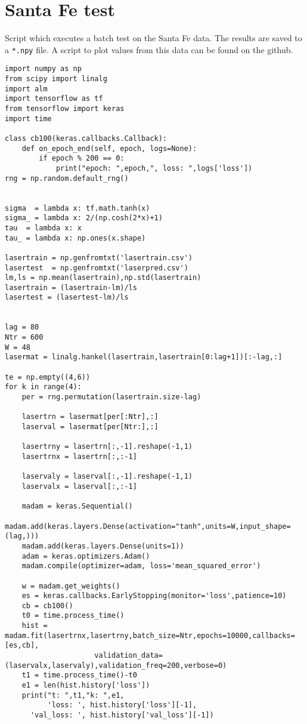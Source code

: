 \section{Santa Fe test}
Script which executes a batch test on the Santa Fe data. The results are saved to a \texttt{*.npy} file. A script to plot values from this data can be found on the github.
\label{santafecode}
\begin{verbatim}
import numpy as np
from scipy import linalg
import alm
import tensorflow as tf
from tensorflow import keras
import time

class cb100(keras.callbacks.Callback):
    def on_epoch_end(self, epoch, logs=None):
        if epoch % 200 == 0:
            print("epoch: ",epoch,", loss: ",logs['loss'])
rng = np.random.default_rng()


sigma  = lambda x: tf.math.tanh(x)
sigma_ = lambda x: 2/(np.cosh(2*x)+1)
tau  = lambda x: x
tau_ = lambda x: np.ones(x.shape)

lasertrain = np.genfromtxt('lasertrain.csv')
lasertest  = np.genfromtxt('laserpred.csv')
lm,ls = np.mean(lasertrain),np.std(lasertrain)
lasertrain = (lasertrain-lm)/ls
lasertest = (lasertest-lm)/ls


lag = 80
Ntr = 600
W = 48
lasermat = linalg.hankel(lasertrain,lasertrain[0:lag+1])[:-lag,:]

te = np.empty((4,6))
for k in range(4):
    per = rng.permutation(lasertrain.size-lag)
    
    lasertrn = lasermat[per[:Ntr],:]
    laserval = lasermat[per[Ntr:],:]
    
    lasertrny = lasertrn[:,-1].reshape(-1,1)
    lasertrnx = lasertrn[:,:-1]
    
    laservaly = laserval[:,-1].reshape(-1,1)
    laservalx = laserval[:,:-1]
    
    madam = keras.Sequential()
    madam.add(keras.layers.Dense(activation="tanh",units=W,input_shape=(lag,)))
    madam.add(keras.layers.Dense(units=1))
    adam = keras.optimizers.Adam()
    madam.compile(optimizer=adam, loss='mean_squared_error')
    
    w = madam.get_weights()
    es = keras.callbacks.EarlyStopping(monitor='loss',patience=10)
    cb = cb100()
    t0 = time.process_time()
    hist = madam.fit(lasertrnx,lasertrny,batch_size=Ntr,epochs=10000,callbacks=[es,cb],
    				 validation_data=(laservalx,laservaly),validation_freq=200,verbose=0)
    t1 = time.process_time()-t0
    e1 = len(hist.history['loss'])
    print("t: ",t1,"k: ",e1,
          'loss: ', hist.history['loss'][-1],
      'val_loss: ', hist.history['val_loss'][-1])
    

\end{verbatim}
